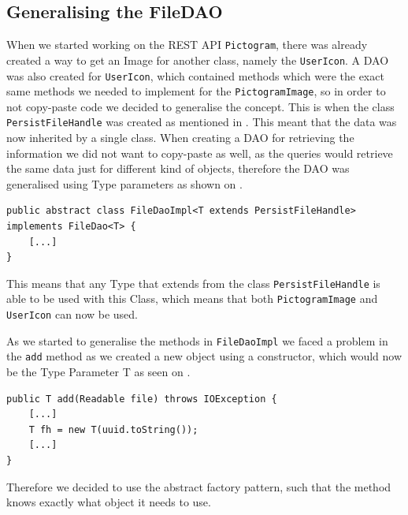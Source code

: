 \subsection{Generalising the FileDAO}\label{subsec:persistfilehandle}
When we started working on the REST API \texttt{Pictogram}, there was already created a way to get an Image for another class, namely the \texttt{UserIcon}.
A DAO was also created for \texttt{UserIcon}, which contained methods which were the exact same methods we needed to implement for the \texttt{PictogramImage}, so in order to not copy-paste code we decided to generalise the concept.
This is when the class \texttt{PersistFileHandle} was created as mentioned in .
This meant that the data was now inherited by a single class.
When creating a DAO for retrieving the information we did not want to copy-paste as well, as the queries would retrieve the same data just for different kind of objects, therefore the DAO was generalised using Type parameters as shown on .


\begin{lstlisting}[float, floatplacement=h, caption={The \texttt{FileDaoImpl} class header which uses Type Parameters to generalise which types it can be used with. \texttt{[...]} denotes omitted code.},label={lst:typeparameter}]
public abstract class FileDaoImpl<T extends PersistFileHandle> implements FileDao<T> {
	[...]
}
\end{lstlisting}

This means that any Type that extends from the class \texttt{PersistFileHandle} is able to be used with this Class, which means that both \texttt{PictogramImage} and \texttt{UserIcon} can now be used.

As we started to generalise the methods in \texttt{FileDaoImpl} we faced a problem in the \texttt{add} method as we created a new object using a constructor, which would now be the Type Parameter T as seen on .

\begin{lstlisting}[float, floatplacement=h, caption={Trying to use a Type Parameter constructor, which Java cannot do. \texttt{[...]} denotes omitted code.},label={lst:TypeParameterConstructor}]
public T add(Readable file) throws IOException {
    [...]
    T fh = new T(uuid.toString());
    [...]
}
\end{lstlisting}
Therefore we decided to use the abstract factory pattern, such that the method knows exactly what object it needs to use.

